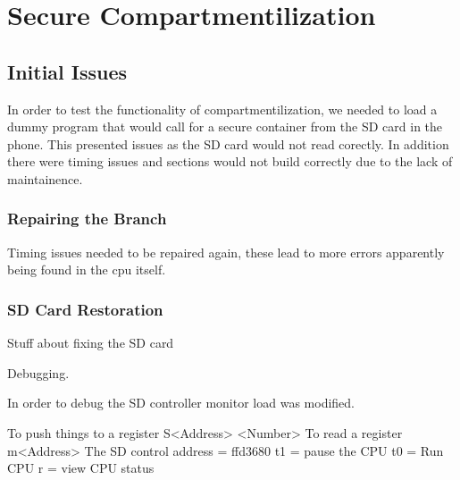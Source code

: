 
\chapter{Secure Compartmentilization} %

\label{Chapter 6} %


\section{Initial Issues}

\label{Ch6 Sec1}

In order to test the functionality of compartmentilization, we needed to load a dummy program that would call for a secure container from the SD card in the phone. This presented issues as the SD card would not read corectly. In addition there were timing issues and sections would not build correctly due to the lack of maintainence.

\subsection{Repairing the Branch}

\label{Ch6 Sec1 Sub1}

Timing issues needed to be repaired again, these lead to more errors apparently being found in the cpu itself.

\subsection{SD Card Restoration}

\label{Ch6 Sec1 Sub2}

Stuff about fixing the SD card

Debugging.

In order to debug the SD controller monitor load was modified.

To push things to a register S<Address> <Number>
To read a register m<Address> 
The SD control address = ffd3680
t1 = pause the CPU
t0 = Run CPU
r = view CPU status

